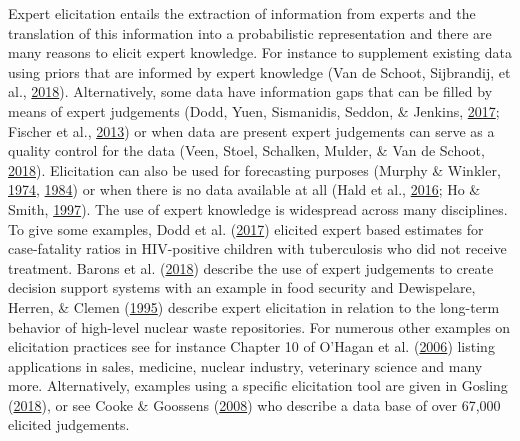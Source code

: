 \documentclass[openright,titlepage,12pt,a4paper]{book}
\begin{document}
Expert elicitation entails the extraction of information from experts and the translation of this information into a probabilistic representation and there are many reasons to elicit expert knowledge. For instance to supplement existing data using priors that are informed by expert knowledge (Van de Schoot, Sijbrandij, et al., \protect\hyperlink{ref-van_de_schoot_bayesian_2018}{2018}). Alternatively, some data have information gaps that can be filled by means of expert judgements (Dodd, Yuen, Sismanidis, Seddon, \& Jenkins, \protect\hyperlink{ref-dodd_global_2017}{2017}; Fischer et al., \protect\hyperlink{ref-fischer_estimating_2013}{2013}) or when data are present expert judgements can serve as a quality control for the data (Veen, Stoel, Schalken, Mulder, \& Van de Schoot, \protect\hyperlink{ref-veen_using_2018}{2018}). Elicitation can also be used for forecasting purposes (Murphy \& Winkler, \protect\hyperlink{ref-murphy_subjective_1974}{1974}, \protect\hyperlink{ref-murphy_probability_1984}{1984}) or when there is no data available at all (Hald et al., \protect\hyperlink{ref-hald_world_2016}{2016}; Ho \& Smith, \protect\hyperlink{ref-ho_volcanic_1997}{1997}). The use of expert knowledge is widespread across many disciplines. To give some examples, Dodd et al. (\protect\hyperlink{ref-dodd_global_2017}{2017}) elicited expert based estimates for case-fatality ratios in HIV-positive children with tuberculosis who did not receive treatment. Barons et al. (\protect\hyperlink{ref-barons_eliciting_2018}{2018}) describe the use of expert judgements to create decision support systems with an example in food security and Dewispelare, Herren, \& Clemen (\protect\hyperlink{ref-dewispelare_use_1995}{1995}) describe expert elicitation in relation to the long-term behavior of high-level nuclear waste repositories. For numerous other examples on elicitation practices see for instance Chapter 10 of O'Hagan et al. (\protect\hyperlink{ref-ohagan_uncertain_2006}{2006}) listing applications in sales, medicine, nuclear industry, veterinary science and many more. Alternatively, examples using a specific elicitation tool are given in Gosling (\protect\hyperlink{ref-gosling_shelf:_2018}{2018}), or see Cooke \& Goossens (\protect\hyperlink{ref-cooke_tu_2008}{2008}) who describe a data base of over 67,000 elicited judgements.
\end{document}
